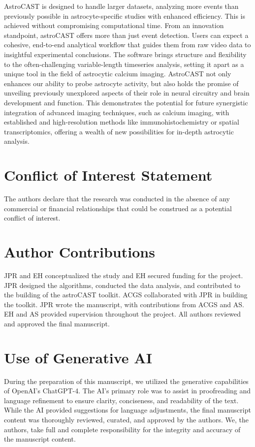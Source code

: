 \documentclass[utf8]{FrontiersinHarvard}
\begin{document}
    AstroCAST is designed to handle larger datasets, analyzing more events than previously possible in astrocyte-specific studies with enhanced efficiency. This is achieved without compromising computational time. From an innovation standpoint, astroCAST offers more than just event detection. Users can expect a cohesive, end-to-end analytical workflow that guides them from raw video data to insightful experimental conclusions. The software brings structure and flexibility to the often-challenging variable-length timeseries analysis, setting it apart as a unique tool in the field of astrocytic calcium imaging. AstroCAST not only enhances our ability to probe astrocyte activity, but also holds the promise of unveiling previously unexplored aspects of their role in neural circuitry and brain development and function. This demonstrates the potential for future synergistic integration of advanced imaging techniques, such as calcium imaging, with established and high-resolution methods like immunohistochemistry or spatial transcriptomics, offering a wealth of new possibilities for in-depth astrocytic analysis.

    \section*{Conflict of Interest Statement}
    The authors declare that the research was conducted in the absence of any commercial or financial relationships that could be construed as a potential conflict of interest.

    \section*{Author Contributions}
    JPR and EH conceptualized the study and EH secured funding for the project. JPR designed the algorithms, conducted the data analysis, and contributed to the building of the astroCAST toolkit. ACGS collaborated with JPR in building the toolkit. JPR wrote the manuscript, with contributions from ACGS and AS. EH and AS provided supervision throughout the project. All authors reviewed and approved the final manuscript.

    \section*{Use of Generative AI}
    During the preparation of this manuscript, we utilized the generative capabilities of OpenAI's ChatGPT-4. The AI's primary role was to assist in proofreading and language refinement to ensure clarity, conciseness, and readability of the text. While the AI provided suggestions for language adjustments, the final manuscript content was thoroughly reviewed, curated, and approved by the authors. We, the authors, take full and complete responsibility for the integrity and accuracy of the manuscript content.
\end{document}
